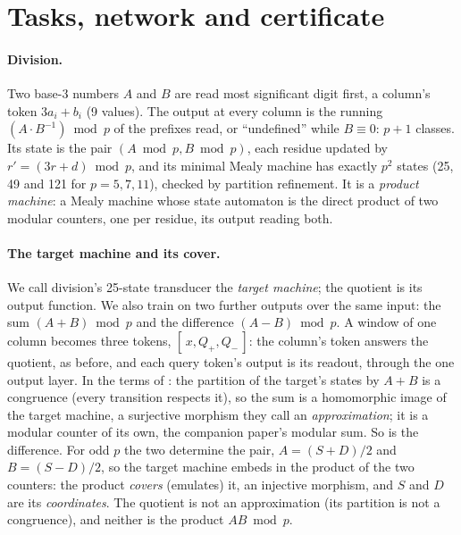\documentclass[11pt]{article}
\begin{document}
\section{Tasks, network and certificate}
\label{sec:setup}

\paragraph{Division.} Two base-3 numbers $A$ and $B$ are read most significant digit first, a column's
token $3a_i + b_i$ (9 values). The output at every column is the running $(A \cdot B^{-1}) \bmod p$ of
the prefixes read, or ``undefined'' while $B \equiv 0$: $p + 1$ classes. Its state is the pair
$(A \bmod p, B \bmod p)$, each residue updated by $r' = (3r + d) \bmod p$, and its minimal Mealy machine
has exactly $p^2$ states (25, 49 and 121 for $p = 5, 7, 11$), checked by partition refinement. It is a
\emph{product machine}: a Mealy machine whose state automaton is the direct product of two modular
counters, one per residue, its output reading both.

\paragraph{The target machine and its cover.}
\label{sec:family}
We call division's 25-state transducer the \emph{target machine}; the quotient is its output
function. We also train on two further outputs over the same input: the sum $(A + B) \bmod p$ and the
difference $(A - B) \bmod p$. A window of one column becomes three tokens, $[\,x, Q_{+}, Q_{-}\,]$:
the column's token answers the quotient, as before, and each query token's output is its readout,
through the one output layer. In the terms of
\citet{egri-nagy-2024-covering-lemma-transformation-semigroups}: the partition of the target's states
by $A + B$ is a congruence (every transition respects it), so the sum is a homomorphic image of the
target machine, a surjective morphism they call an \emph{approximation}; it is a modular counter of
its own, the companion paper's modular sum. So is the difference. For odd $p$ the two determine the
pair, $A = (S + D)/2$ and $B = (S - D)/2$, so the target machine embeds in the product of the two
counters: the product \emph{covers} (emulates) it, an injective morphism, and $S$ and $D$ are its
\emph{coordinates}. The quotient is not an approximation (its partition is not a congruence), and
neither is the product $A B \bmod p$.
\end{document}

